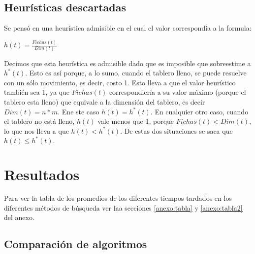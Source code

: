 \documentclass[%
    final,
    reprint,
    notitlepage,
    narroweqnarray,
    inline,
    twoside,
    invited
    ]{ieee}
\begin{document}
\subsection{Heur\'isticas descartadas}
Se pens\'o en una heur\'istica admisible en el cual el valor correspond\'ia a la formula:\\

\begin{center}
\begin{math}
    h(t) = \frac{Fichas(t)}{Dim(t)}
\end{math}\\
\end{center}

\par Decimos que esta heur\'istica es admisible dado que es imposible que sobreestime a $h^*(t)$. Esto es as\'i porque, a lo sumo, cuando el tablero lleno, se puede resuelve con un s\'olo movimiento, es decir, costo 1. Esto lleva a que el valor heur\'istico tambi\'en sea 1, ya que $Fichas(t)$ correspondier\'ia a su valor m\'aximo (porque el tablero esta lleno) que equivale a la dimensi\'on del tablero, es decir $Dim(t)=n*m$. Ene ste caso $h(t) = h^*(t)$. En cualquier otro caso, cuando el tablero no est\'a lleno, $h(t)$ vale menos que 1, porque $Fichas(t) < Dim(t)$, lo que nos lleva a que $h(t) < h^*(t)$. De estas dos situaciones se saca que $h(t) \le h^*(t)$.\\
\section{Resultados}
Para ver la tabla de los promedios de los diferentes tiempos tardados en los diferentes m\'etodos de b\'usqueda ver laa secciones \ref{anexo:tabla} y \ref{anexo:tabla2} del anexo.
\subsection{Comparaci\'on de algoritmos}
\end{document}
